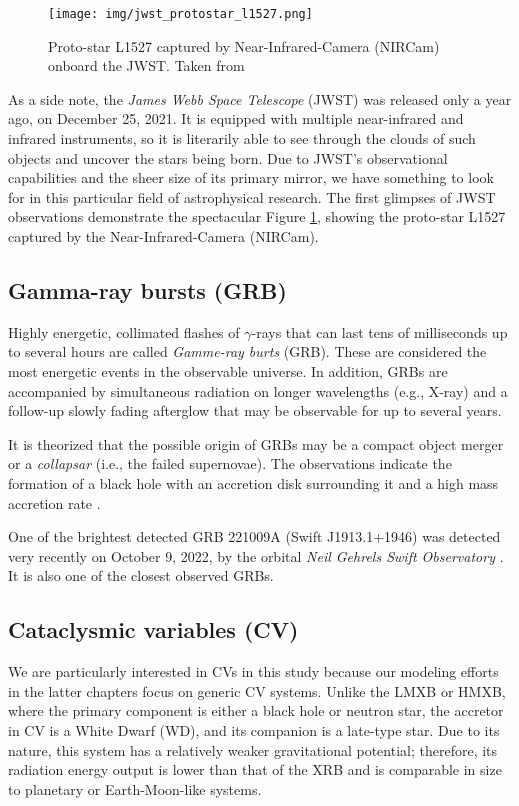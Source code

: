     \begin{figure}[h]
        \centering
        \texttt{[image: img/jwst\_protostar\_l1527.png]}
        \caption{Proto-star L1527 captured by Near-Infrared-Camera (NIRCam) onboard the JWST. Taken from \citep{nasa_img_l1527}}
        \label{fig:jwst_protostar_l1527}
    \end{figure}


    As a side note, the \emph{James Webb Space Telescope} (JWST) was released only a year ago, on December 25, 2021. It is equipped with multiple near-infrared and infrared instruments, so it is literarily able to see through the clouds of such objects and uncover the stars being born. Due to JWST's observational capabilities and the sheer size of its primary mirror, we have something to look for in this particular field of astrophysical research. The first glimpses of JWST observations demonstrate the spectacular Figure \ref{fig:jwst_protostar_l1527}, showing the proto-star L1527 captured by the Near-Infrared-Camera (NIRCam). 

\subsection{Gamma-ray bursts (GRB)}
    Highly energetic, collimated flashes of $\gamma$-rays that can last tens of milliseconds up to several hours are called \emph{Gamme-ray burts} (GRB). These are considered the most energetic events in the observable universe. In addition, GRBs are accompanied by simultaneous radiation on longer wavelengths (e.g., X-ray) and a follow-up slowly fading afterglow that may be observable for up to several years. 

    It is theorized that the possible origin of GRBs may be a compact object merger or a \emph{collapsar} (i.e., the failed supernovae). The observations indicate the formation of a black hole with an accretion disk surrounding it and a high mass accretion rate \citep{piran2005}.

    One of the brightest detected GRB 221009A (Swift J1913.1+1946) was detected very recently on October 9, 2022, by the orbital \emph{Neil Gehrels Swift Observatory} \citep{grb_221009a}. It is also one of the closest observed GRBs. 


\subsection{Cataclysmic variables (CV)}
    We are particularly interested in CVs in this study because our modeling efforts in the latter chapters focus on generic CV systems. Unlike the LMXB or HMXB, where the primary component is either a black hole or neutron star, the accretor in CV is a White Dwarf (WD), and its companion is a late-type star. Due to its nature, this system has a relatively weaker gravitational potential; therefore, its radiation energy output is lower than that of the XRB and is comparable in size to planetary or Earth-Moon-like systems. 

